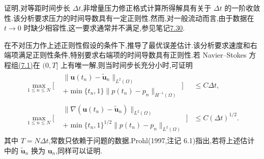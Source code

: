 \begin{note}[非增量压力修正格式的数值分析]\label{note:nonincremental-pressure-correction-analysis}
\textcite{Shen1992a}证明,对等距时间步长 $\Delta t$,非增量压力修正格式计算所得解具有关于 $\Delta t$ 的一阶收敛性.该分析要求压力的时间导数具有一定正则性.然而,对一般流动而言,由于数据在 $t\to0$ 时缺少相容性,这一要求通常并不满足,参见笔记\hyperref[note:time-dependent-initial-compatibility]{7.30}.

\textcite[Theorem~6.1]{Prohl1997}在不对压力作上述正则性假设的条件下,推导了最优误差估计.该分析要求速度和右端项满足正则性条件,特别要求右端项的时间导数具有正则性.若 Navier--Stokes 方程组\hyperref[eq:time-dependent-ns-strong]{(7.1)}在 $(0,T]$ 上有唯一解,则当时间步长充分小时,可证明
\begin{equation}
\label{eq:nonincremental-pressure-correction-errors}
\begin{aligned}
 \max_{1\le n\le N}\Biggl[
   \begin{aligned}
    &\|\bm{u}(t_n)-\widetilde{\bm{u}}_n\|_{L^2(\Omega)}\\
    &+\min\{t_n,1\}
      \|p(t_n)-p_n\|_{H^{-1}(\Omega)}
   \end{aligned}
 \Biggr]
 &\le C\Delta t,\\
 \max_{1\le n\le N}\Biggl[
   \begin{aligned}
    &\|\nabla(\bm{u}(t_n)-\widetilde{\bm{u}}_n)\|_{L^2(\Omega)}\\
    &+\min\{t_n,1\}^{1/2}
      \|p(t_n)-p_n\|_{L^2(\Omega)}
   \end{aligned}
 \Biggr]
 &\le C(\Delta t)^{1/2}.
\end{aligned}
\end{equation}
其中 $T=N\Delta t$,常数只依赖于问题的数据.Prohl(1997,注记 6.1)指出,若将上述估计中的 $\widetilde{\bm{u}}_n$ 换为 $\bm{u}_n$,同样可以证明.
\end{note}

